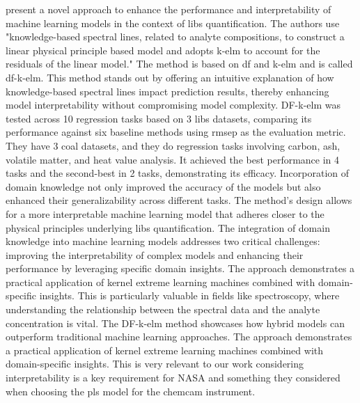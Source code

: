 \citet{song_DF-K-ELM} present a novel approach to enhance the performance and interpretability of machine learning models in the context of \gls{libs} quantification.
The authors use "knowledge-based spectral lines, related to analyte compositions, to construct a linear physical principle based model and adopts \gls{k-elm} to account for the residuals of the linear model."
The method is based on \gls{df} and \gls{k-elm} and is called \gls{df}-\gls{k-elm}.
This method stands out by offering an intuitive explanation of how knowledge-based spectral lines impact prediction results, thereby enhancing model interpretability without compromising model complexity.
DF-\gls{k-elm} was tested across 10 regression tasks based on 3 \gls{libs} datasets, comparing its performance against six baseline methods using \gls{rmsep} as the evaluation metric.
They have 3 coal datasets, and they do regression tasks involving carbon, ash, volatile matter, and heat value analysis.
It achieved the best performance in 4 tasks and the second-best in 2 tasks, demonstrating its efficacy.
Incorporation of domain knowledge not only improved the accuracy of the models but also enhanced their generalizability across different tasks.
The method's design allows for a more interpretable machine learning model that adheres closer to the physical principles underlying \gls{libs} quantification.
The integration of domain knowledge into machine learning models addresses two critical challenges: improving the interpretability of complex models and enhancing their performance by leveraging specific domain insights.
The approach demonstrates a practical application of kernel extreme learning machines combined with domain-specific insights.
This is particularly valuable in fields like spectroscopy, where understanding the relationship between the spectral data and the analyte concentration is vital.
The DF-\gls{k-elm} method showcases how hybrid models can outperform traditional machine learning approaches.
The approach demonstrates a practical application of kernel extreme learning machines combined with domain-specific insights.
This is very relevant to our work considering interpretability is a key requirement for NASA and something they considered when choosing the \gls{pls} model for the \gls{chemcam} instrument.

